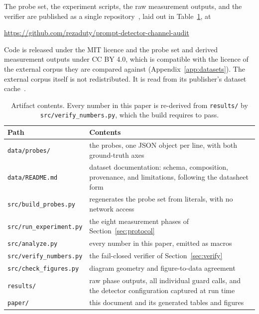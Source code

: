 \documentclass[conference]{IEEEtran}
\begin{document}
The probe set, the experiment scripts, the raw measurement outputs, and the
verifier are published as a single repository~\cite{rashidi2026artifact}, laid out in
Table~\ref{tab:artifact}, at

\begin{center}
\url{https://github.com/rezaduty/prompt-detector-channel-audit}
\end{center}

Code is released under the MIT licence and the probe set and derived
measurement outputs under CC BY 4.0, which is compatible with the licence of
the external corpus they are compared against
(Appendix~\ref{app:datasets}). The external corpus itself is not
redistributed. It is read from its publisher's dataset
cache~\cite{deepset_promptinjections}.

\begin{table}[t]
\centering
\footnotesize
\begin{tabular}{lp{11.4cm}}
\toprule
Path & Contents \\
\midrule
\texttt{data/probes/} & the \NProbes{} probes, one JSON object per line, with
  both ground-truth axes \\
\texttt{data/README.md} & dataset documentation: schema, composition,
  provenance, and limitations, following the datasheet
  form~\cite{gebru2021datasheets} \\
\texttt{src/build\_probes.py} & regenerates the probe set from literals, with
  no network access \\
\texttt{src/run\_experiment.py} & the eight measurement phases of
  Section~\ref{sec:protocol} \\
\texttt{src/analyze.py} & every number in this paper, emitted as macros \\
\texttt{src/verify\_numbers.py} & the fail-closed verifier of
  Section~\ref{sec:verify} \\
\texttt{src/check\_figures.py} & diagram geometry and figure-to-data agreement \\
\texttt{results/} & raw phase outputs, all \NGuardCalls{} individual guard
  calls, and the detector configuration captured at run time \\
\texttt{paper/} & this document and its generated tables and figures \\
\bottomrule
\end{tabular}
\caption{Artifact contents. Every number in this paper is re-derived from
\texttt{results/} by \texttt{src/verify\_numbers.py}, which the build requires
to pass.}
\label{tab:artifact}
\end{table}
\end{document}
